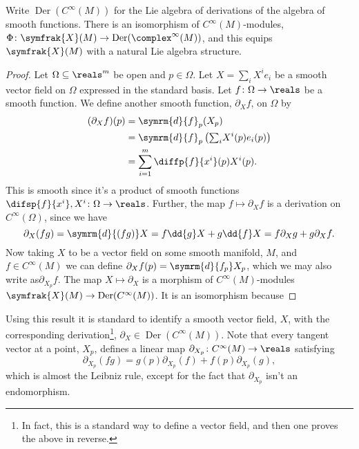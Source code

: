 \documentclass[fleqn]{NotesClass}
\renewcommand{\dl}{\symrm{d}}
\newcommand{\vectorFields}{\symfrak{X}}
\DeclareMathOperator{\Der}{Der}
\newcommand{\derivations}{\Der}
\begin{document}
    \begin{thm}{}{}
        Write \(\derivations(C^{\infty}(M))\) for the Lie algebra of derivations of the algebra of smooth functions. There is an isomorphism of \(C^{\infty}(M)\)-modules, \(\Phi \colon \vectorFields(M) \to \derivations(\complex^{\infty}(M))\), and this equips \(\vectorFields(M)\) with a natural Lie algebra structure.
        \begin{proof}
            Let \(\Omega \subseteq \reals^m\) be open and \(p \in \Omega\).
            Let \(X = \sum_i X^i e_i\) be a smooth vector field on \(\Omega\) expressed in the standard basis.
            Let \(f \colon \Omega \to \reals\) be a smooth function.
            We define another smooth function, \(\partial_Xf\), on \(\Omega\) by
            \begin{align}
                (\partial_X f)(p) &= \dl{f}_p(X_p)\\
                &= \dl{f}_p\left( {\textstyle\sum_i} X^i(p)e_i(p) \right)\\
                &= \sum_{i=1}^m \diffp{f}{x^i}(p) X^i(p).
            \end{align}
            This is smooth since it's a product of smooth functions \(\difsp{f}{x^i}, X^i \colon \Omega \to \reals\).
            Further, the map \(f \mapsto \partial_X f\) is a derivation on \(C^{\infty}(\Omega)\), since we have
            \begin{equation}
                \partial_X(fg) = \dl{(fg)}X = f \dd{g}X + g \dd{f}X = f\partial_Xg + g\partial_Xf.
            \end{equation}
            Now taking \(X\) to be a vector field on some smooth manifold, \(M\), and \(f \in C^{\infty}(M)\) we can define \(\partial_Xf(p) = \dl{f_p}X_p\), which we may also write as\(\partial_{X_p}f\).
            The map \(X \mapsto \partial_X\) is a morphism of \(C^{\infty}(M)\)-modules \(\vectorFields(M) \to \derivations(C^{\infty}(M))\).
            It is an isomorphism because %
        \end{proof}
    \end{thm}
    
    Using this result it is standard to identify a smooth vector field, \(X\), with the corresponding derivation\footnote{In fact, this is a standard way to define a vector field, and then one proves the above in reverse.}, \(\partial_X \in \derivations(C^{\infty}(M))\).
    Note that every tangent vector at a point, \(X_p\), defines a linear map \(\partial_{X_p} \colon C^{\infty}(M) \to \reals\) satisfying
    \begin{equation}
        \partial_{X_p}(fg) = g(p) \partial_{X_p}(f) + f(p) \partial_{X_p}(g),
    \end{equation}
    which is almost the Leibniz rule, except for the fact that \(\partial_{X_p}\) isn't an endomorphism.
    
    
    
    
%        
%
\end{document}
